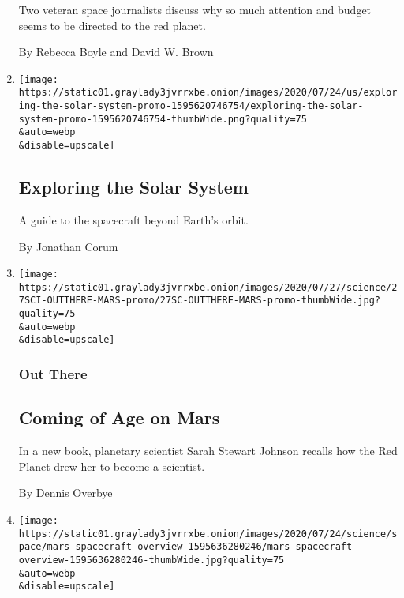 \begin{enumerate}
  Two veteran space journalists discuss why so much attention and budget
  seems to be directed to the red planet.

  By Rebecca Boyle and David W. Brown
\item
  \href{/interactive/2020/science/exploring-the-solar-system.html}{}

  \texttt{[image: https://static01.graylady3jvrrxbe.onion/images/2020/07/24/us/exploring-the-solar-system-promo-1595620746754/exploring-the-solar-system-promo-1595620746754-thumbWide.png?quality=75\\\&auto=webp\\\&disable=upscale]}

  \hypertarget{exploring-the-solar-system}{%
  \subsection{Exploring the Solar
  System}\label{exploring-the-solar-system}}

  A guide to the spacecraft beyond Earth's orbit.

  By Jonathan Corum
\item
  \href{/2020/07/27/science/mars-sarah-stewart-johnson.html}{}

  \texttt{[image: https://static01.graylady3jvrrxbe.onion/images/2020/07/27/science/27SCI-OUTTHERE-MARS-promo/27SC-OUTTHERE-MARS-promo-thumbWide.jpg?quality=75\\\&auto=webp\\\&disable=upscale]}

  \hypertarget{out-there}{%
  \subsubsection{Out There}\label{out-there}}

  \hypertarget{coming-of-age-on-mars}{%
  \subsection{Coming of Age on Mars}\label{coming-of-age-on-mars}}

  In a new book, planetary scientist Sarah Stewart Johnson recalls how
  the Red Planet drew her to become a scientist.

  By Dennis Overbye
\item
  \href{/interactive/2020/science/mars-perseverance-tianwen-hope.html}{}

  \texttt{[image: https://static01.graylady3jvrrxbe.onion/images/2020/07/24/science/space/mars-spacecraft-overview-1595636280246/mars-spacecraft-overview-1595636280246-thumbWide.jpg?quality=75\\\&auto=webp\\\&disable=upscale]}


\end{enumerate}
